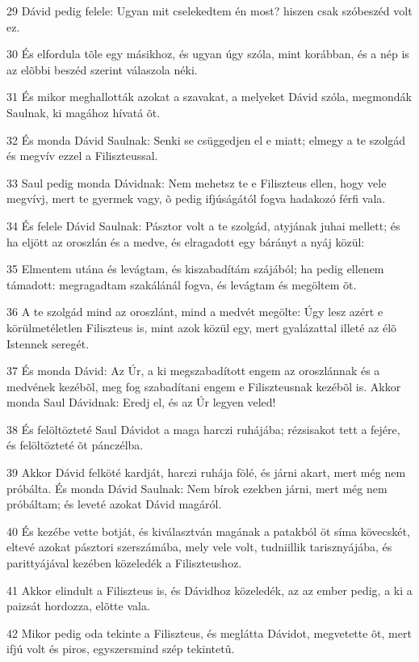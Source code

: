 \par 29 Dávid pedig felele: Ugyan mit cselekedtem én most? hiszen csak szóbeszéd volt ez.
\par 30 És elfordula tõle egy másikhoz, és ugyan úgy szóla, mint korábban, és a nép is az elõbbi beszéd szerint válaszola néki.
\par 31 És mikor meghallották azokat a szavakat, a melyeket Dávid szóla, megmondák Saulnak, ki magához hívatá õt.
\par 32 És monda Dávid Saulnak: Senki se csüggedjen el e miatt; elmegy a te szolgád és megvív ezzel a Filiszteussal.
\par 33 Saul pedig monda Dávidnak: Nem mehetsz te e Filiszteus ellen, hogy vele megvívj, mert te gyermek vagy, õ pedig ifjúságától fogva hadakozó férfi vala.
\par 34 És felele Dávid Saulnak: Pásztor volt a te szolgád, atyjának juhai mellett; és ha eljött az oroszlán és a medve, és elragadott egy bárányt a nyáj közül:
\par 35 Elmentem utána és levágtam, és kiszabadítám szájából; ha pedig ellenem támadott: megragadtam szakálánál fogva, és levágtam és megöltem õt.
\par 36 A te szolgád mind az oroszlánt, mind a medvét megölte: Úgy lesz azért e körülmetéletlen Filiszteus is, mint azok közül egy, mert gyalázattal illeté az élõ Istennek seregét.
\par 37 És monda Dávid: Az Úr, a ki megszabadított engem az oroszlánnak és a medvének kezébõl, meg fog szabadítani engem e Filiszteusnak kezébõl is. Akkor monda Saul Dávidnak: Eredj el, és az Úr legyen veled!
\par 38 És felöltözteté Saul Dávidot a maga harczi ruhájába; rézsisakot tett a fejére, és felöltözteté õt pánczélba.
\par 39 Akkor Dávid felköté kardját, harczi ruhája fölé, és járni akart, mert még nem próbálta. És monda Dávid Saulnak: Nem bírok ezekben járni, mert még nem próbáltam; és leveté azokat Dávid magáról.
\par 40 És kezébe vette botját, és kiválasztván magának a patakból öt síma kövecskét, eltevé azokat pásztori szerszámába, mely vele volt, tudniillik tarisznyájába, és parittyájával kezében közeledék a Filiszteushoz.
\par 41 Akkor elindult a Filiszteus is, és Dávidhoz közeledék, az az ember pedig, a ki a paizsát hordozza, elõtte vala.
\par 42 Mikor pedig oda tekinte a Filiszteus, és meglátta Dávidot, megvetette õt, mert ifjú volt és piros, egyszersmind szép tekintetû.
